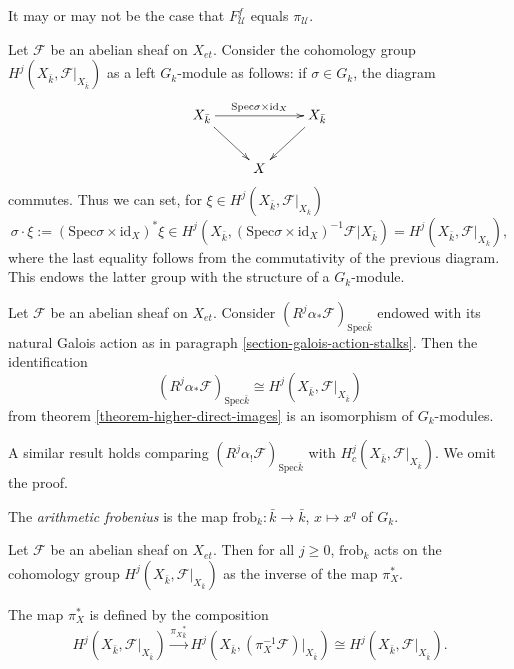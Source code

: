 \begin{remark}
It may or may not be the case that $F^f_\mathcal{U}$ equals $\pi_\mathcal{U}$.
\end{remark}

Let $\mathcal{F}$ be an abelian sheaf on $X_{et}$. Consider the cohomology 
group $H^j (X_{\bar k}, \mathcal{F}|_{X_{\bar k}})$ as a left $G_k$-module as 
follows: if $\sigma \in G_k$, the diagram 
$$
\xymatrix{
X_{\bar k} \ar[rd] \ar^{\text{Spec} \sigma \times \text{id}_X}[rr] && X_{\bar 
k} \ar[ld]\\
& X
}
$$
commutes. Thus we can set, for $\xi \in H^j (X_{\bar k}, \mathcal{F}|_{X_{\bar 
k}})$
$$
\sigma \cdot \xi := (\text{Spec} \sigma \times \text{id}_X)^*\xi \in 
H^j(X_{\bar k}, (\text{Spec} \sigma \times \text{id}_X)^{-1} 
\mathcal{F}|{X_{\bar k}})
= H^j (X_{\bar k}, \mathcal{F}|_{X_{\bar k}}),
$$
where the last equality follows from the commutativity of the previous diagram. 
This endows the latter group with the structure of a $G_k$-module.

\begin{lemma}
Let $\mathcal{F}$ be an abelian sheaf on $X_{et}$. Consider 
$(R^j\alpha_*\mathcal{F})_{\text{Spec} \bar k}$ endowed with its natural Galois 
action as in paragraph \ref{section-galois-action-stalks}. Then the 
identification
$$
(R^j\alpha_*\mathcal{F})_{\text{Spec} \bar k} \cong H^j (X_{\bar k}, 
\mathcal{F}|_{X_{\bar k}})
$$
from theorem \ref{theorem-higher-direct-images} is an isomorphism of 
$G_k$-modules.
\end{lemma}

A similar result holds comparing $(R^j\alpha_!\mathcal{F})_{\text{Spec} \bar 
k}$ with $H^j_c (X_{\bar k}, \mathcal{F}|_{X_{\bar k}})$. We omit the proof.

\begin{definition}
The {\it arithmetic frobenius} is the map $\text{frob}_k : \bar k \to \bar k$, 
$x \mapsto x^q$  of $G_k$.
\end{definition}

\begin{theorem}
Let $\mathcal{F}$ be an abelian sheaf on $X_{et}$. Then for all $j\geq 0$, 
$\text{frob}_k$ acts on the cohomology group $H^j(X_{\bar k}, 
\mathcal{F}|_{X_{\bar k}})$ as the inverse of the map $\pi_X^*$.
\end{theorem}

The map $\pi_X^*$ is defined by the composition
$$
H^j(X_{\bar k}, \mathcal{F}|_{X_{\bar k}}) \xrightarrow{{\pi_X}_{\bar k}^*}
H^j(X_{\bar k}, (\pi_X^{-1} \mathcal{F})|_{X_{\bar k}}) \cong
H^j(X_{\bar k}, \mathcal{F}|_{X_{\bar k}}).
$$

